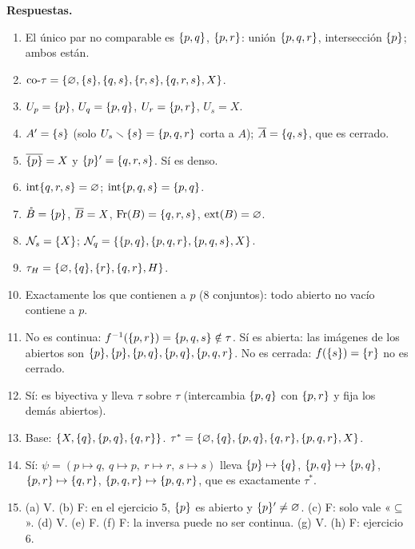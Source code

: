 \begin{respuesta}
\textbf{\sffamily\color{verde!70!black}Respuestas.}
\begin{enumerate}[leftmargin=1.8em,itemsep=0.2em]
\item El único par no comparable es $\{p,q\}$, $\{p,r\}$: unión $\{p,q,r\}$, intersección $\{p\}$; ambos están.
\item $\mathrm{co}\text{-}\tau=\{\varnothing,\{s\},\{q,s\},\{r,s\},\{q,r,s\},X\}$.
\item $U_p=\{p\}$, $U_q=\{p,q\}$, $U_r=\{p,r\}$, $U_s=X$.
\item $A'=\{s\}$ (solo $U_s\smallsetminus\{s\}=\{p,q,r\}$ corta a $A$); $\overline{A}=\{q,s\}$, que es cerrado.
\item $\overline{\{p\}}=X$ y $\{p\}'=\{q,r,s\}$. Sí es denso.
\item $\operatorname{int}\{q,r,s\}=\varnothing$; $\operatorname{int}\{p,q,s\}=\{p,q\}$.
\item $\mathring{B}=\{p\}$, $\overline{B}=X$, $\operatorname{Fr}(B)=\{q,r,s\}$, $\operatorname{ext}(B)=\varnothing$.
\item $\mathcal{N}_s=\{X\}$; $\mathcal{N}_q=\{\{p,q\},\{p,q,r\},\{p,q,s\},X\}$.
\item $\tau_H=\{\varnothing,\{q\},\{r\},\{q,r\},H\}$.
\item Exactamente los que contienen a $p$ (8 conjuntos): todo abierto no vacío contiene a $p$.
\item No es continua: $f^{-1}(\{p,r\})=\{p,q,s\}\notin\tau$. Sí es abierta: las imágenes de los abiertos son
$\{p\},\{p\},\{p,q\},\{p,q\},\{p,q,r\}$. No es cerrada: $f(\{s\})=\{r\}$ no es cerrado.
\item Sí: es biyectiva y lleva $\tau$ sobre $\tau$ (intercambia $\{p,q\}$ con $\{p,r\}$ y fija los demás abiertos).
\item Base: $\{X,\{q\},\{p,q\},\{q,r\}\}$. $\tau^{\ast}=\{\varnothing,\{q\},\{p,q\},\{q,r\},\{p,q,r\},X\}$.
\item Sí: $\psi=(p\mapsto q,\ q\mapsto p,\ r\mapsto r,\ s\mapsto s)$ lleva $\{p\}\mapsto\{q\}$, $\{p,q\}\mapsto\{p,q\}$,
$\{p,r\}\mapsto\{q,r\}$, $\{p,q,r\}\mapsto\{p,q,r\}$, que es exactamente $\tau^{\ast}$.
\item (a) V. (b) F: en el ejercicio 5, $\{p\}$ es abierto y $\{p\}'\neq\varnothing$. (c) F: solo vale «$\subseteq$». (d) V.
(e) F. (f) F: la inversa puede no ser continua. (g) V. (h) F: ejercicio 6.
\end{enumerate}
\end{respuesta}

